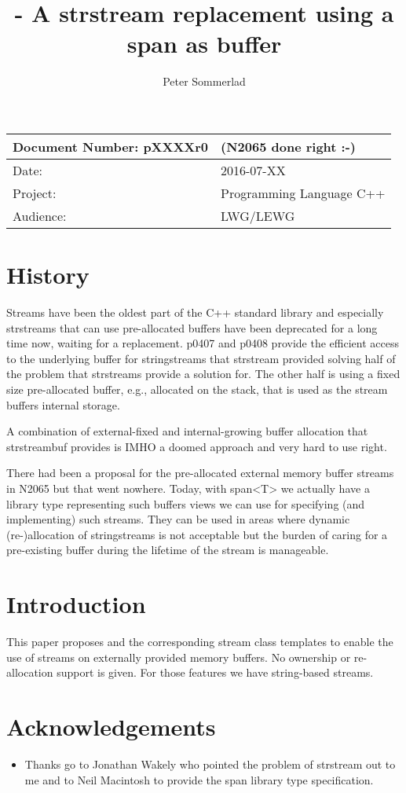 \documentclass[ebook,11pt,article]{memoir}
\title{\papernumber{} - A strstream replacement using a span as buffer}
\author{Peter Sommerlad}
\date{\paperdate}                        %
\newcommand{\papernumber}{pXXXXr0}
\newcommand{\paperdate}{2016-07-XX}
\begin{document}
\maketitle
\begin{tabular}[t]{|l|l|}\hline 
Document Number: \papernumber & (N2065 done right :-)\\\hline
Date: & \paperdate \\\hline
Project: & Programming Language C++\\\hline 
Audience: & LWG/LEWG\\\hline
\end{tabular}

\chapter{History}
Streams have been the oldest part of the C++ standard library and especially strstreams that can use pre-allocated buffers have been deprecated for a long time now, waiting for a replacement. p0407 and p0408 provide the efficient access to the underlying buffer for stringstreams that strstream provided solving half of the problem that strstreams provide a solution for. The other half is using a fixed size pre-allocated buffer, e.g., allocated on the stack, that is used as the stream buffers internal storage.

A combination of external-fixed and internal-growing buffer allocation that strstreambuf provides is IMHO a doomed approach and very hard to use right.

There had been a proposal for the pre-allocated external memory buffer streams in N2065 but that went nowhere. Today, with span<T> we actually have a library type representing such buffers views we can use for specifying (and implementing) such streams. They can be used in areas where dynamic (re-)allocation of stringstreams is not acceptable but the burden of caring for a pre-existing buffer during the lifetime of the stream is manageable. 

\chapter{Introduction}
This paper proposes  and the corresponding stream class templates to enable the use of streams on externally provided memory buffers. No ownership or re-allocation support is given. For those features we have string-based streams.

\chapter{Acknowledgements}
\begin{itemize}
\item Thanks go to Jonathan Wakely who pointed the problem of strstream out to me and to Neil Macintosh to provide the span library type specification.
\end{itemize}
\end{document}
